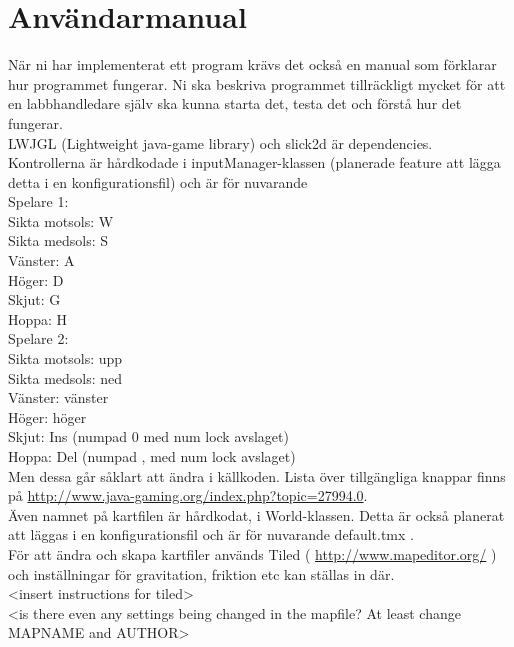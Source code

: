 \section{Användarmanual}
{\color{red}När ni har implementerat ett program krävs det också en manual som förklarar hur programmet fungerar. Ni ska beskriva programmet tillräckligt mycket för att en labbhandledare själv ska kunna starta det, testa det och förstå hur det fungerar. \\}
\vspace{11pt}
LWJGL (Lightweight java-game library) och slick2d är dependencies.\\
Kontrollerna är hårdkodade i inputManager-klassen (planerade feature att lägga detta i en konfigurationsfil) och är för nuvarande\\
Spelare 1:\\
Sikta motsols: W\\
Sikta medsols: S\\
Vänster: A\\
Höger: D\\
Skjut: G\\
Hoppa: H\\
\vspace{11pt}
Spelare 2:\\
Sikta motsols: upp\\
Sikta medsols: ned\\
Vänster: vänster\\
Höger: höger\\
Skjut: Ins (numpad 0 med num lock avslaget)\\
Hoppa: Del (numpad , med num lock avslaget)\\
\vspace{11pt}
Men dessa går såklart att ändra i källkoden. Lista över tillgängliga knappar finns på \url{http://www.java-gaming.org/index.php?topic=27994.0}.\\
\vspace{11pt}
\vspace{11pt}
Även namnet på kartfilen är hårdkodat, i World-klassen. Detta är också planerat att läggas i en konfigurationsfil och är för nuvarande default.tmx .\\
För att ändra och skapa kartfiler används Tiled ( \url{http://www.mapeditor.org/} ) och inställningar för gravitation, friktion etc kan ställas in där.\\
\vspace{11pt}
<insert instructions for tiled>\\
<is there even any settings being changed in the mapfile? At least change MAPNAME and AUTHOR>\\
